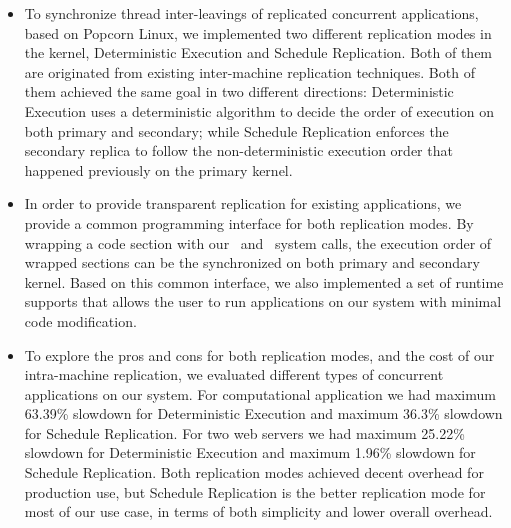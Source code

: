 \begin{itemize}
\item To synchronize thread inter-leavings of replicated concurrent applications, based on Popcorn Linux, we implemented two different replication modes in the kernel, Deterministic Execution and Schedule Replication. Both of them are originated from existing inter-machine replication techniques. Both of them achieved the same goal in two different directions: Deterministic Execution uses a deterministic algorithm to decide the order of execution on both primary and secondary; while Schedule Replication enforces the secondary replica to follow the non-deterministic execution order that happened previously on the primary kernel.

\item In order to provide transparent replication for existing applications, we provide a common programming interface for both replication modes. By wrapping a code section with our \detstart\ and \detend\ system calls, the execution order of wrapped sections can be the synchronized on both primary and secondary kernel. Based on this common interface, we also implemented a set of runtime supports that allows the user to run applications on our system with minimal code modification.

\item To explore the pros and cons for both replication modes, and the cost of our intra-machine replication, we evaluated different types of concurrent applications on our system. For computational application we had maximum 63.39\% slowdown for Deterministic Execution and maximum 36.3\% slowdown for Schedule Replication. For two web servers we had maximum 25.22\% slowdown for Deterministic Execution and maximum 1.96\% slowdown for Schedule Replication. Both replication modes achieved decent overhead for production use, but Schedule Replication is the better replication mode for most of our use case, in terms of both simplicity and lower overall overhead.

\end{itemize}

